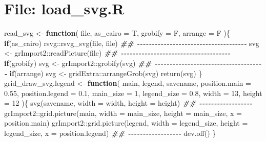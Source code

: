 \documentclass[
]{article}
\newenvironment{Shaded}{\begin{snugshade}}{\end{snugshade}}
\newcommand{\AttributeTok}[1]{\textcolor[rgb]{0.77,0.63,0.00}{#1}}
\newcommand{\ControlFlowTok}[1]{\textcolor[rgb]{0.13,0.29,0.53}{\textbf{#1}}}
\newcommand{\DecValTok}[1]{\textcolor[rgb]{0.00,0.00,0.81}{#1}}
\newcommand{\DocumentationTok}[1]{\textcolor[rgb]{0.56,0.35,0.01}{\textbf{\textit{#1}}}}
\newcommand{\FloatTok}[1]{\textcolor[rgb]{0.00,0.00,0.81}{#1}}
\newcommand{\FunctionTok}[1]{\textcolor[rgb]{0.00,0.00,0.00}{#1}}
\newcommand{\NormalTok}[1]{#1}
\newcommand{\OtherTok}[1]{\textcolor[rgb]{0.56,0.35,0.01}{#1}}
\newcommand{\SpecialCharTok}[1]{\textcolor[rgb]{0.00,0.00,0.00}{#1}}
\begin{document}
\hypertarget{file-load_svg.r}{%
\section{File: load\_svg.R}\label{file-load_svg.r}}

\begin{Shaded}
\begin{Highlighting}[]
\NormalTok{read\_svg }\OtherTok{\textless{}{-}} 
  \ControlFlowTok{function}\NormalTok{(}
\NormalTok{           file,}
           \AttributeTok{as\_cairo =}\NormalTok{ T,}
           \AttributeTok{grobify =}\NormalTok{ F,}
           \AttributeTok{arrange =}\NormalTok{ F}
\NormalTok{           )\{}
    \ControlFlowTok{if}\NormalTok{(as\_cairo)}
\NormalTok{      rsvg}\SpecialCharTok{::}\FunctionTok{rsvg\_svg}\NormalTok{(file, file)}
    \DocumentationTok{\#\# {-}{-}{-}{-}{-}{-}{-}{-}{-}{-}{-}{-}{-}{-}{-}{-}{-}{-}{-}{-}{-}{-}{-}{-}{-}{-}{-}{-}{-}{-}{-}{-}{-}{-}{-}{-}{-} }
\NormalTok{    svg }\OtherTok{\textless{}{-}}\NormalTok{ grImport2}\SpecialCharTok{::}\FunctionTok{readPicture}\NormalTok{(file)}
    \DocumentationTok{\#\# {-}{-}{-}{-}{-}{-}{-}{-}{-}{-}{-}{-}{-}{-}{-}{-}{-}{-}{-}{-}{-}{-}{-}{-}{-}{-}{-}{-}{-}{-}{-}{-}{-}{-}{-}{-}{-} }
    \ControlFlowTok{if}\NormalTok{(grobify)}
\NormalTok{      svg }\OtherTok{\textless{}{-}}\NormalTok{ grImport2}\SpecialCharTok{::}\FunctionTok{grobify}\NormalTok{(svg)}
    \DocumentationTok{\#\# {-}{-}{-}{-}{-}{-}{-}{-}{-}{-}{-}{-}{-}{-}{-}{-}{-}{-}{-}{-}{-}{-}{-}{-}{-}{-}{-}{-}{-}{-}{-}{-}{-}{-}{-}{-}{-} }
    \ControlFlowTok{if}\NormalTok{(arrange)}
\NormalTok{      svg }\OtherTok{\textless{}{-}}\NormalTok{ gridExtra}\SpecialCharTok{::}\FunctionTok{arrangeGrob}\NormalTok{(svg)}
    \FunctionTok{return}\NormalTok{(svg)}
\NormalTok{  \}}
\NormalTok{grid\_draw\_svg.legend }\OtherTok{\textless{}{-}} 
  \ControlFlowTok{function}\NormalTok{(}
\NormalTok{           main,}
\NormalTok{           legend,}
\NormalTok{           savename,}
           \AttributeTok{position.main =} \FloatTok{0.55}\NormalTok{,}
           \AttributeTok{position.legend =} \FloatTok{0.1}\NormalTok{,}
           \AttributeTok{main\_size =} \DecValTok{1}\NormalTok{,}
           \AttributeTok{legend\_size =} \FloatTok{0.8}\NormalTok{,}
           \AttributeTok{width =} \DecValTok{13}\NormalTok{,}
           \AttributeTok{height =} \DecValTok{12}
\NormalTok{           )\{}
    \FunctionTok{svg}\NormalTok{(savename, }\AttributeTok{width =}\NormalTok{ width, }\AttributeTok{height =}\NormalTok{ height)}
    \DocumentationTok{\#\# {-}{-}{-}{-}{-}{-}{-}{-}{-}{-}{-}{-}{-}{-}{-}{-}{-}{-} }
\NormalTok{    grImport2}\SpecialCharTok{::}\FunctionTok{grid.picture}\NormalTok{(main, }\AttributeTok{width =}\NormalTok{ main\_size, }\AttributeTok{height =}\NormalTok{ main\_size, }\AttributeTok{x =}\NormalTok{ position.main)}
\NormalTok{    grImport2}\SpecialCharTok{::}\FunctionTok{grid.picture}\NormalTok{(legend, }\AttributeTok{width =}\NormalTok{ legend\_size, }\AttributeTok{height =}\NormalTok{ legend\_size, }\AttributeTok{x =}\NormalTok{ position.legend)}
    \DocumentationTok{\#\# {-}{-}{-}{-}{-}{-}{-}{-}{-}{-}{-}{-}{-}{-}{-}{-}{-}{-} }
    \FunctionTok{dev.off}\NormalTok{()}
\NormalTok{  \}}
\end{Highlighting}
\end{Shaded}
\end{document}
